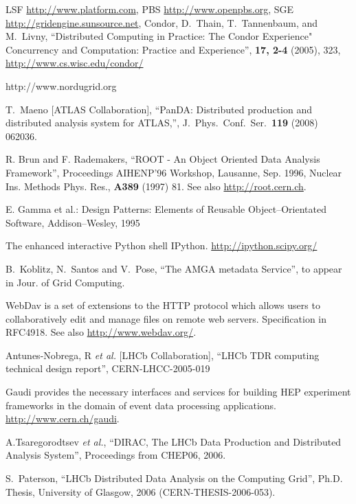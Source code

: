 \documentclass{elsart}
\begin{document}
\begin{thebibliography}{00}

  LSF \url{http://www.platform.com}, PBS \url{http://www.openpbs.org}, SGE
  \url{http://gridengine.sunsource.net}, Condor, D.~Thain, T.~Tannenbaum, and
  M.~Livny, ``Distributed Computing in Practice: The Condor Experience"
  Concurrency and Computation: Practice and Experience'', {\bf 17, 2-4}
  (2005), 323, \url{http://www.cs.wisc.edu/condor/}

 http://www.nordugrid.org

 T.~Maeno [ATLAS Collaboration], ``PanDA: Distributed production and distributed analysis system for
ATLAS,'', J.\ Phys.\ Conf.\ Ser.\  {\bf 119} (2008) 062036.

  R. Brun and F. Rademakers, ``ROOT - An Object Oriented Data Analysis
  Framework'', Proceedings AIHENP'96 Workshop, Lausanne, Sep. 1996, Nuclear
  Ins. Methods Phys. Res., {\bf A389} (1997) 81. See also
  \url{http://root.cern.ch}.

  E. Gamma et al.: Design Patterns: Elements of Reusable Object--Orientated Software, 
  Addison--Wesley, 1995

 The enhanced interactive Python shell IPython.
  \url{http://ipython.scipy.org/}

 B.~Koblitz, N.~Santos and V.~Pose, ``The AMGA metadata
  Service'', to appear in Jour. of Grid Computing.

 WebDav is a set of extensions to the HTTP protocol which
  allows users to collaboratively edit and manage files on remote web servers.
  Specification in RFC4918. See also \url{http://www.webdav.org/}.


    Antunes-Nobrega, R {\it et al.} [LHCb Collaboration],
  ``LHCb TDR computing technical design report'', CERN-LHCC-2005-019

  Gaudi provides the necessary interfaces and services for building HEP
  experiment frameworks in the domain of event data processing
  applications. \url{http://www.cern.ch/gaudi}.

  A.Tsaregorodtsev {\it et al.}, ``DIRAC, The LHCb Data Production and
  Distributed Analysis System'', Proceedings from CHEP06, 2006.

  S.~Paterson, ``LHCb Distributed Data Analysis on the Computing Grid'', Ph.D.
  Thesis, University of Glasgow, 2006 (CERN-THESIS-2006-053).


\end{thebibliography}
\end{document}
